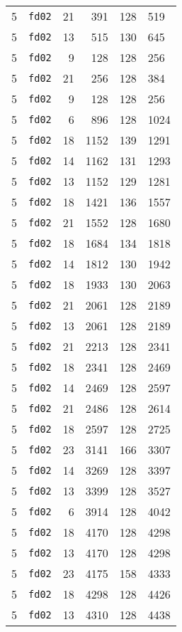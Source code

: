 \documentclass{article}
\begin{document}
\begin{table}[h!]
\begin{tabular}{llrrrl}
    5 & \texttt{fd02} & 21 & 391 & 128 & 519 \\
    5 & \texttt{fd02} & 13 & 515 & 130 & 645 \\
    5 & \texttt{fd02} & 9 & 128 & 128 & 256 \\
    5 & \texttt{fd02} & 21 & 256 & 128 & 384 \\
    5 & \texttt{fd02} & 9 & 128 & 128 & 256 \\
    5 & \texttt{fd02} & 6 & 896 & 128 & 1024 \\
    5 & \texttt{fd02} & 18 & 1152 & 139 & 1291 \\
    5 & \texttt{fd02} & 14 & 1162 & 131 & 1293 \\
    5 & \texttt{fd02} & 13 & 1152 & 129 & 1281 \\
    5 & \texttt{fd02} & 18 & 1421 & 136 & 1557 \\
    5 & \texttt{fd02} & 21 & 1552 & 128 & 1680 \\
    5 & \texttt{fd02} & 18 & 1684 & 134 & 1818 \\
    5 & \texttt{fd02} & 14 & 1812 & 130 & 1942 \\
    5 & \texttt{fd02} & 18 & 1933 & 130 & 2063 \\
    5 & \texttt{fd02} & 21 & 2061 & 128 & 2189 \\
    5 & \texttt{fd02} & 13 & 2061 & 128 & 2189 \\
    5 & \texttt{fd02} & 21 & 2213 & 128 & 2341 \\
    5 & \texttt{fd02} & 18 & 2341 & 128 & 2469 \\
    5 & \texttt{fd02} & 14 & 2469 & 128 & 2597 \\
    5 & \texttt{fd02} & 21 & 2486 & 128 & 2614 \\
    5 & \texttt{fd02} & 18 & 2597 & 128 & 2725 \\
    5 & \texttt{fd02} & 23 & 3141 & 166 & 3307 \\
    5 & \texttt{fd02} & 14 & 3269 & 128 & 3397 \\
    5 & \texttt{fd02} & 13 & 3399 & 128 & 3527 \\
    5 & \texttt{fd02} & 6 & 3914 & 128 & 4042 \\
    5 & \texttt{fd02} & 18 & 4170 & 128 & 4298 \\
    5 & \texttt{fd02} & 13 & 4170 & 128 & 4298 \\
    5 & \texttt{fd02} & 23 & 4175 & 158 & 4333 \\
    5 & \texttt{fd02} & 18 & 4298 & 128 & 4426 \\
    5 & \texttt{fd02} & 13 & 4310 & 128 & 4438 \\

\end{tabular}
\end{table}
\end{document}
